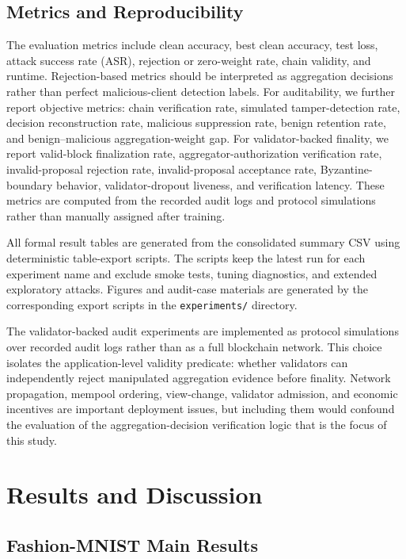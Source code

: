 \documentclass[preprint,authoryear,12pt]{elsarticle}
\begin{document}
\subsection{Metrics and Reproducibility}

The evaluation metrics include clean accuracy, best clean accuracy, test loss, attack success rate (ASR), rejection or zero-weight rate, chain validity, and runtime. Rejection-based metrics should be interpreted as aggregation decisions rather than perfect malicious-client detection labels. For auditability, we further report objective metrics: chain verification rate, simulated tamper-detection rate, decision reconstruction rate, malicious suppression rate, benign retention rate, and benign--malicious aggregation-weight gap. For validator-backed finality, we report valid-block finalization rate, aggregator-authorization verification rate, invalid-proposal rejection rate, invalid-proposal acceptance rate, Byzantine-boundary behavior, validator-dropout liveness, and verification latency. These metrics are computed from the recorded audit logs and protocol simulations rather than manually assigned after training.

All formal result tables are generated from the consolidated summary CSV using deterministic table-export scripts. The scripts keep the latest run for each experiment name and exclude smoke tests, tuning diagnostics, and extended exploratory attacks. Figures and audit-case materials are generated by the corresponding export scripts in the \texttt{experiments/} directory.

The validator-backed audit experiments are implemented as protocol simulations over recorded audit logs rather than as a full blockchain network. This choice isolates the application-level validity predicate: whether validators can independently reject manipulated aggregation evidence before finality. Network propagation, mempool ordering, view-change, validator admission, and economic incentives are important deployment issues, but including them would confound the evaluation of the aggregation-decision verification logic that is the focus of this study.

\section{Results and Discussion}

\subsection{Fashion-MNIST Main Results}
\end{document}
